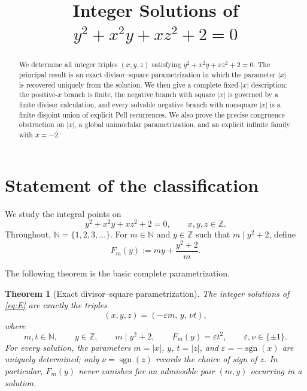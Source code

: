 \documentclass[11pt,a4paper]{amsart}
\title[Integer solutions of a cubic Diophantine equation]
{Integer Solutions of \(y^2+x^2y+xz^2+2=0\)}
\author{}
\date{}
\numberwithin{equation}{section}
\newtheorem{theorem}{Theorem}[section]
\theoremstyle{definition}
\DeclareMathOperator{\sgn}{sgn}
\newcommand{\Z}{\mathbb Z}
\newcommand{\N}{\mathbb N}
\begin{document}
\begin{abstract}
We determine all integer triples \((x,y,z)\) satisfying
\(y^2+x^2y+xz^2+2=0\).
The principal result is an exact divisor--square parametrization in which the parameter \(|x|\) is recovered uniquely from the solution.
We then give a complete fixed-\(|x|\) description: the positive-\(x\) branch is finite, the negative branch with square \(|x|\) is governed by a finite divisor calculation, and every solvable negative branch with nonsquare \(|x|\) is a finite disjoint union of explicit Pell recurrences.
We also prove the precise congruence obstruction on \(|x|\), a global unimodular parametrization, and an explicit infinite family with \(x=-2\).
\end{abstract}

\maketitle

\section{Statement of the classification}

We study the integral points on
\begin{equation}
 y^2+x^2y+xz^2+2=0,
 \qquad x,y,z\in\Z.
 \label{eq:E}
\end{equation}
Throughout, \(\N=\{1,2,3,\ldots\}\).  For \(m\in\N\) and
\(y\in\Z\) such that \(m\mid y^2+2\), define
\begin{equation}
 F_m(y):=my+\frac{y^2+2}{m}.
 \label{eq:Fdef}
\end{equation}

The following theorem is the basic complete parametrization.

\begin{theorem}[Exact divisor--square parametrization]\label{thm:main}
The integer solutions of \eqref{eq:E} are exactly the triples
\begin{equation}
 (x,y,z)=(-\varepsilon m,\,y,\,\nu t),
 \label{eq:mainparam}
\end{equation}
where
\begin{equation}
 m,t\in\N,\qquad y\in\Z,\qquad
 m\mid y^2+2,\qquad
 F_m(y)=\varepsilon t^2,
 \qquad \varepsilon,\nu\in\{\pm1\}.
 \label{eq:mainconditions}
\end{equation}
For every solution, the parameters \(m=|x|\), \(y\),
\(t=|z|\), and \(\varepsilon=-\sgn(x)\) are uniquely determined;
only \(\nu=\sgn(z)\) records the choice of sign of \(z\).
In particular, \(F_m(y)\) never vanishes for an admissible pair
\((m,y)\) occurring in a solution.
\end{theorem}
\end{document}
